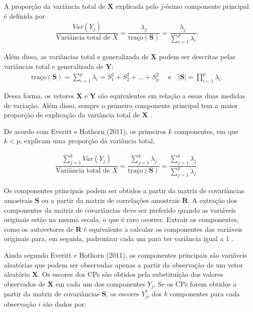 \documentclass[12pt,a4paper]{article}
\begin{document}
A proporção da variância total de $\boldsymbol{X}$ explicada pelo $j$-ésimo componente principal é definida por
\begin{align*}
	\dfrac{Var(Y_j)}{\textrm{Variância total de } X} = \dfrac{\lambda_j}{\textrm{traço}(\boldsymbol{S})} = \dfrac{\lambda_j}{\displaystyle\sum_{i=1}^{p}\lambda_i}.
\end{align*}
	
Além disso, as variâncias total e generalizada de $\boldsymbol{X}$ podem ser descritas pelas variâncias total e generalizada de $\boldsymbol{Y}$:
\begin{align*}
	\textrm{traço}(\boldsymbol{S}) = \displaystyle\sum_{i=1}^{p}\lambda_i = S_1^2 + S_2^2 + \dots + S_p^2 \quad \textrm{ e} \quad |\boldsymbol{S}| = \prod_{i=1}^{p}\lambda_i.
\end{align*}
	
Dessa forma, os vetores $\boldsymbol{X}$ e $\boldsymbol{Y}$ são equivalentes em relação a essas duas medidas de variação. Além disso, sempre o primeiro componente principal tem a maior proporção de explicação da variância total de $\boldsymbol{X}$ \cite{mingoti10}.
	
De acordo com Everitt e Hothorn (2011), os primeiros $k$ componentes, em que $k < p$, explicam uma proporção da variância total,
	
\begin{align*}
    \dfrac{\displaystyle\sum_{j=1}^{k}Var(Y_j)}{\textrm{Variância total de } X} = \dfrac{\displaystyle\sum_{j=1}^{k}\lambda_j}{\textrm{traço}(\boldsymbol{S})} = \dfrac{\displaystyle\sum_{j=1}^{k}\lambda_j}{\displaystyle\sum_{j=1}^{p}\lambda_j}.
\end{align*}
	
Os componentes principais podem ser obtidos a partir da matriz de covariâncias amostrais $\boldsymbol{S}$ ou a partir da matriz de correlações amostrais $\boldsymbol{R}$. A extração dos componentes da matriz de covariâncias deve ser preferido quando as variáveis originais estão na mesma escala, o que é raro ocorrer. Extrair os componentes, como os autovetores de $\boldsymbol{R}$ é equivalente a calcular os componentes das variáveis originais para, em seguida, padronizar cada um para ter variância igual a $1$ \cite{everitt11}.
	
Ainda segundo Everitt e Hothorn (2011), os componentes principais são variáveis aleatórias que podem ser observadas apenas a partir da observação de um vetor aleatório $\boldsymbol{X}$. Os escores dos CPs são obtidos pela substituição dos valores observados de $\boldsymbol{X}$ em cada um dos componentes $Y_j$. Se os CPs forem obtidos a partir da matriz de covariâncias $\boldsymbol{S}$, os escores $Y^*_{ji}$ dos $k$ componentes para cada observação $i$ são dados por:  
	
\end{document}
